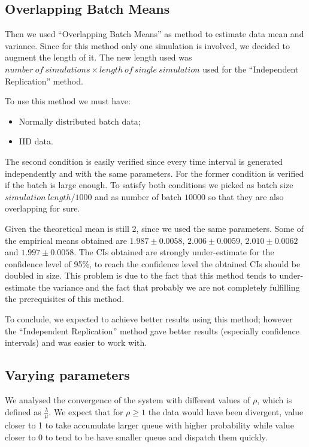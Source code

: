 \documentclass[10pt,a4paper]{article}
\begin{document}
\subsection*{Overlapping Batch Means}

Then we used ``Overlapping Batch Means'' as method to estimate data mean and variance. Since for this method only one simulation is involved, we decided to augment the length of it. The new length used was \(\mathit{number~of~simulations}\times\mathit{length~of~single~simulation}\) used for the ``Independent Replication'' method.

To use this method we must have:
\begin{itemize}
\item Normally distributed batch data;
\item IID data.
\end{itemize}

The second condition is easily verified since every time interval is generated independently and with the same parameters. For the former condition is verified if the batch is large enough. To satisfy both conditions we picked as batch size \(\mathit{simulation~length} / 1000\) and as number of batch \(10000\) so that they are also overlapping for sure.

Given the theoretical mean is still 2, since we used the same parameters. Some of the empirical means obtained are \( 1.987 \pm 0.0058\), \(2.006 \pm 0.0059\), \(2.010 \pm 0.0062\) and \(1.997 \pm 0.0058\). The CIs obtained are strongly under-estimate for the confidence level of 95\%, to reach the confidence level the obtained CIs should be doubled in size. This problem is due to the fact that this method tends to under-estimate the variance and the fact that probably we are not completely fulfilling the prerequisites of this method.

To conclude, we expected to achieve better results using this method; however the ``Independent Replication'' method gave better results (especially confidence intervals) and was easier to work with.

\subsection*{Varying parameters}

We analysed the convergence of the system with different values of \(\rho\), which is defined as \(\frac \lambda \mu\). We expect that for \(\rho \ge 1\) the data would have been divergent, value closer to 1 to take accumulate larger queue with higher probability while value closer to 0 to tend to be have smaller queue and dispatch them quickly.
\end{document}
